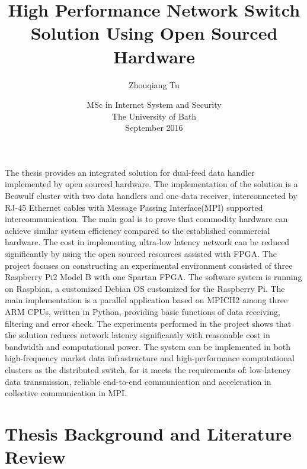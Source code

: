 \documentclass[11pt,openright,a4paper]{report}
\title{High Performance Network Switch Solution Using Open Sourced Hardware}
\author{Zhouqiang Tu}
\date{MSc in Internet System and Security\\The University of Bath\\September 2016}
\begin{document}
\lstset{language=Java,breaklines,breakatwhitespace,basicstyle=\small}


\setcounter{page}{0}


\maketitle
\newpage


\newpage


\newpage


\abstract
The thesis provides an integrated solution for dual-feed data handler implemented by open sourced hardware. The implementation of the solution is a Beowulf cluster with two data handlers and one data receiver, interconnected by RJ-45 Ethernet cables with Message Passing Interface(MPI) supported intercommunication. The main goal is to prove that commodity hardware can achieve similar system efficiency compared to the established commercial hardware. The cost in implementing ultra-low latency network can be reduced significantly by using the open sourced resources assisted with FPGA. The project focuses on constructing an experimental environment consisted of three Raspberry Pi2 Model B with one Spartan FPGA. The software system is running on Raspbian, a customized Debian OS customized for the Raspberry Pi. The main implementation is a parallel application based on MPICH2 among three ARM CPUs, written in Python, providing basic functions of data receiving,  filtering and error check. The experiments performed in the project shows that the solution reduces network latency significantly with reasonable cost in bandwidth and computational power. The system can be implemented in both high-frequency market data infrastructure and high-performance computational clusters as the distributed switch, for it meets the requirements of: low-latency data transmission, reliable end-to-end communication and acceleration in collective communication in MPI.  
\newpage

\tableofcontents
\newpage
\listoffigures
\newpage
\listoftables
\newpage

\setcounter{page}{1}



\chapter{Thesis Background and Literature Review}
\end{document}

